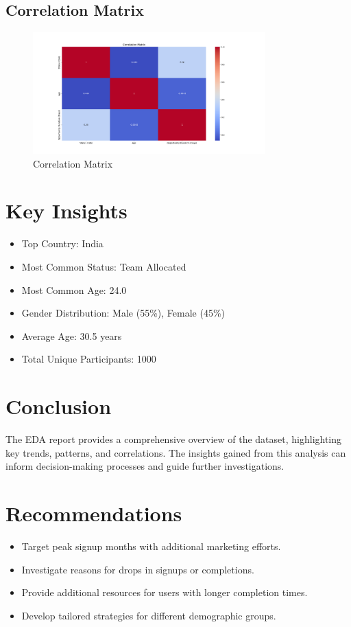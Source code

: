 \documentclass{article}
\begin{document}
\subsection{Correlation Matrix}
\begin{figure}[H]
    \centering
    \includegraphics[width=0.8\textwidth]{../Statistics/Figure_4.png}
    \caption{Correlation Matrix}
\end{figure}

\section{Key Insights}
\begin{itemize}
    \item Top Country: India
    \item Most Common Status: Team Allocated
    \item Most Common Age: 24.0
    \item Gender Distribution: Male (55\%), Female (45\%)
    \item Average Age: 30.5 years
    \item Total Unique Participants: 1000
\end{itemize}

\section{Conclusion}
The EDA report provides a comprehensive overview of the dataset, highlighting key trends, patterns, and correlations. The insights gained from this analysis can inform decision-making processes and guide further investigations.

\section{Recommendations}
\begin{itemize}
    \item Target peak signup months with additional marketing efforts.
    \item Investigate reasons for drops in signups or completions.
    \item Provide additional resources for users with longer completion times.
    \item Develop tailored strategies for different demographic groups.
\end{itemize}
\end{document}
